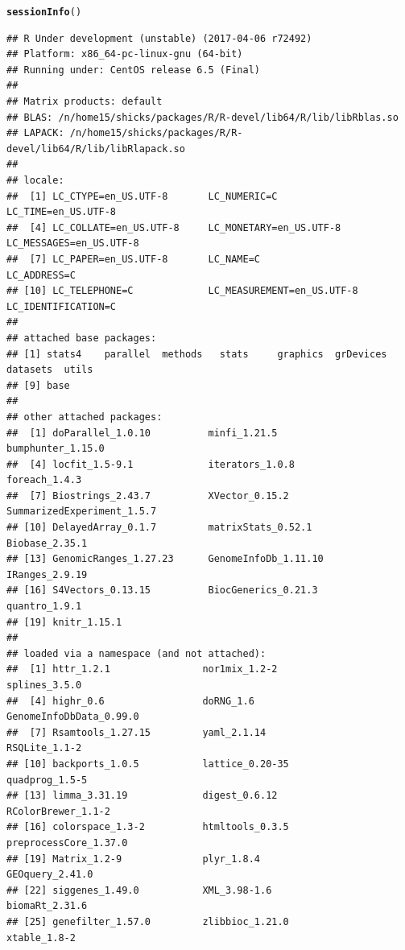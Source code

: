 \documentclass{article}\usepackage[]{graphicx}\usepackage[usenames,dvipsnames]{color}
\makeatletter
\newcommand{\hlstd}[1]{\textcolor[rgb]{0.345,0.345,0.345}{#1}}%
\newcommand{\hlkwd}[1]{\textcolor[rgb]{0.737,0.353,0.396}{\textbf{#1}}}%
\newenvironment{kframe}{%
 \def\at@end@of@kframe{}%
 \ifinner\ifhmode%
  \def\at@end@of@kframe{\end{minipage}}%
  \begin{minipage}{\columnwidth}%
 \fi\fi%
 \def\FrameCommand##1{\hskip\@totalleftmargin \hskip-\fboxsep
 \colorbox{shadecolor}{##1}\hskip-\fboxsep
     \hskip-\linewidth \hskip-\@totalleftmargin \hskip\columnwidth}%
 \MakeFramed {\advance\hsize-\width
   \@totalleftmargin\z@ \linewidth\hsize
   \@setminipage}}%
 {\par\unskip\endMakeFramed%
 \at@end@of@kframe}
\newenvironment{knitrout}{}{} %
\makeatother
\begin{document}
\begin{knitrout}
\color{fgcolor}\begin{kframe}
\begin{alltt}
\hlkwd{sessionInfo}\hlstd{()}
\end{alltt}
\begin{verbatim}
## R Under development (unstable) (2017-04-06 r72492)
## Platform: x86_64-pc-linux-gnu (64-bit)
## Running under: CentOS release 6.5 (Final)
## 
## Matrix products: default
## BLAS: /n/home15/shicks/packages/R/R-devel/lib64/R/lib/libRblas.so
## LAPACK: /n/home15/shicks/packages/R/R-devel/lib64/R/lib/libRlapack.so
## 
## locale:
##  [1] LC_CTYPE=en_US.UTF-8       LC_NUMERIC=C               LC_TIME=en_US.UTF-8       
##  [4] LC_COLLATE=en_US.UTF-8     LC_MONETARY=en_US.UTF-8    LC_MESSAGES=en_US.UTF-8   
##  [7] LC_PAPER=en_US.UTF-8       LC_NAME=C                  LC_ADDRESS=C              
## [10] LC_TELEPHONE=C             LC_MEASUREMENT=en_US.UTF-8 LC_IDENTIFICATION=C       
## 
## attached base packages:
## [1] stats4    parallel  methods   stats     graphics  grDevices datasets  utils    
## [9] base     
## 
## other attached packages:
##  [1] doParallel_1.0.10          minfi_1.21.5               bumphunter_1.15.0         
##  [4] locfit_1.5-9.1             iterators_1.0.8            foreach_1.4.3             
##  [7] Biostrings_2.43.7          XVector_0.15.2             SummarizedExperiment_1.5.7
## [10] DelayedArray_0.1.7         matrixStats_0.52.1         Biobase_2.35.1            
## [13] GenomicRanges_1.27.23      GenomeInfoDb_1.11.10       IRanges_2.9.19            
## [16] S4Vectors_0.13.15          BiocGenerics_0.21.3        quantro_1.9.1             
## [19] knitr_1.15.1              
## 
## loaded via a namespace (and not attached):
##  [1] httr_1.2.1                nor1mix_1.2-2             splines_3.5.0            
##  [4] highr_0.6                 doRNG_1.6                 GenomeInfoDbData_0.99.0  
##  [7] Rsamtools_1.27.15         yaml_2.1.14               RSQLite_1.1-2            
## [10] backports_1.0.5           lattice_0.20-35           quadprog_1.5-5           
## [13] limma_3.31.19             digest_0.6.12             RColorBrewer_1.1-2       
## [16] colorspace_1.3-2          htmltools_0.3.5           preprocessCore_1.37.0    
## [19] Matrix_1.2-9              plyr_1.8.4                GEOquery_2.41.0          
## [22] siggenes_1.49.0           XML_3.98-1.6              biomaRt_2.31.6           
## [25] genefilter_1.57.0         zlibbioc_1.21.0           xtable_1.8-2             

\end{verbatim}
\end{kframe}
\end{knitrout}
\end{document}

